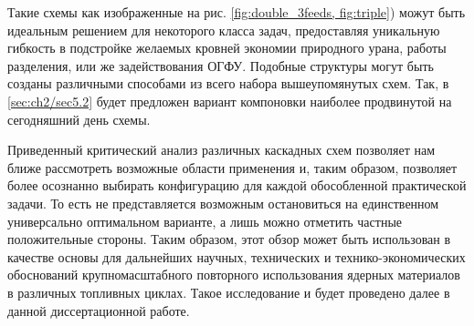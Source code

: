 Такие схемы как изображенные на рис. \ref{fig:double_3feeds, fig:triple}) можут быть идеальным решением для некоторого класса задач, предоставляя уникальную гибкость в подстройке желаемых кровней экономии природного урана, работы разделения, или же задействования ОГФУ. Подобные структуры могут быть созданы различными способами из всего набора вышеупомянутых схем. Так, в \ref{sec:ch2/sec5.2} будет предложен вариант компоновки наиболее продвинутой на сегодняшний день схемы.


Приведенный критический анализ различных каскадных схем позволяет нам ближе рассмотреть возможные области применения и, таким образом, позволяет более осознанно выбирать конфигурацию для каждой обособленной практической задачи. То есть не представляется возможным остановиться на единственном универсально оптимальном варианте, а лишь можно отметить частные положительные стороны. Таким образом, этот обзор может быть использован в качестве основы для дальнейших научных, технических и технико-экономических обоснований крупномасштабного повторного использования ядерных материалов в различных топливных циклах. Такое исследование и будет проведено далее в данной диссертационной работе.

